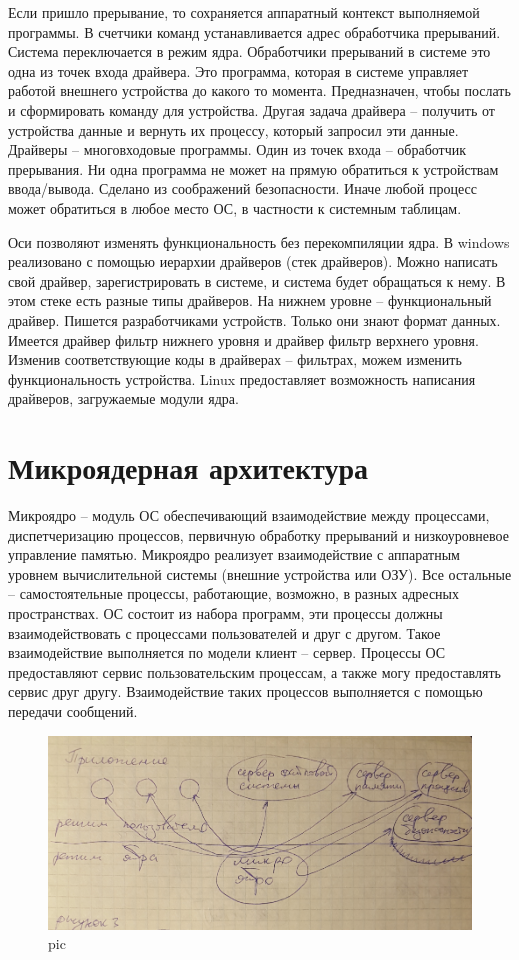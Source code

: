 Если пришло прерывание, то сохраняется аппаратный контекст выполняемой программы. В счетчики команд устанавливается адрес обработчика прерываний. Система переключается в режим ядра.
Обработчики прерываний в системе это одна из точек входа драйвера. Это программа, которая в системе управляет работой внешнего устройства до какого то момента. Предназначен, чтобы послать и сформировать команду для устройства. Другая задача драйвера – получить от устройства данные и вернуть их процессу, который запросил эти данные. Драйверы – многовходовые программы. Один из точек входа – обработчик прерывания.
Ни одна программа не может на прямую обратиться к устройствам ввода/вывода. Сделано из соображений безопасности. Иначе любой процесс может обратиться в любое место ОС, в частности к системным таблицам.

Оси позволяют изменять функциональность без перекомпиляции ядра. 
В windows реализовано с помощью иерархии драйверов (стек драйверов). Можно написать свой драйвер, зарегистрировать в системе, и система будет обращаться к нему. В этом стеке есть разные типы драйверов. На нижнем уровне – функциональный драйвер. Пишется разработчиками устройств. Только они знают формат данных. Имеется драйвер фильтр нижнего уровня и драйвер фильтр верхнего уровня. Изменив соответствующие коды в драйверах – фильтрах, можем изменить функциональность устройства. 
Linux предоставляет возможность написания драйверов, загружаемые модули ядра.

\section{Микроядерная архитектура}

Микроядро – модуль ОС обеспечивающий взаимодействие между процессами, диспетчеризацию процессов, первичную обработку прерываний и низкоуровневое управление памятью. Микроядро реализует взаимодействие с аппаратным уровнем вычислительной системы (внешние устройства или ОЗУ). Все остальные – самостоятельные процессы, работающие, возможно, в разных адресных пространствах. ОС состоит из набора программ, эти процессы должны взаимодействовать с процессами пользователей и друг с другом. Такое взаимодействие выполняется по модели клиент – сервер. Процессы ОС предоставляют сервис пользовательским процессам, а также могу предоставлять сервис друг другу. Взаимодействие таких процессов выполняется с помощью передачи сообщений.

\begin{figure}[H]
    \centering
    \includegraphics[width=\textwidth]{pic/5.png}
    \caption{pic}
\end{figure}

